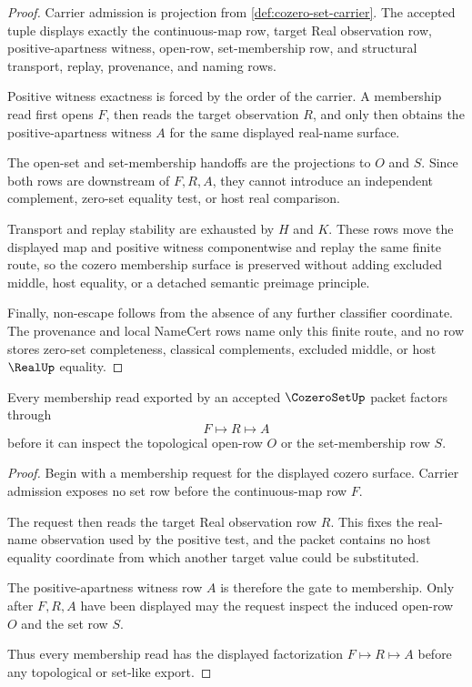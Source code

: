 \begin{proof}
Carrier admission is projection from \autoref{def:cozero-set-carrier}. The accepted tuple displays exactly the continuous-map row, target Real observation row, positive-apartness witness, open-row, set-membership row, and structural transport, replay, provenance, and naming rows.

Positive witness exactness is forced by the order of the carrier. A membership read first opens $F$, then reads the target observation $R$, and only then obtains the positive-apartness witness $A$ for the same displayed real-name surface.

The open-set and set-membership handoffs are the projections to $O$ and $S$. Since both rows are downstream of $F,R,A$, they cannot introduce an independent complement, zero-set equality test, or host real comparison.

Transport and replay stability are exhausted by $H$ and $K$. These rows move the displayed map and positive witness componentwise and replay the same finite route, so the cozero membership surface is preserved without adding excluded middle, host equality, or a detached semantic preimage principle.

Finally, non-escape follows from the absence of any further classifier coordinate. The provenance and local NameCert rows name only this finite route, and no row stores zero-set completeness, classical complements, excluded middle, or host $\RealUp$ equality.
\end{proof}

\begin{theorem}
\label{thm:cozero-set-positive-witness-route}
Every membership read exported by an accepted $\CozeroSetUp$ packet factors through
$$
F \longmapsto R \longmapsto A
$$
before it can inspect the topological open-row $O$ or the set-membership row $S$.
\end{theorem}
\begin{proof}
Begin with a membership request for the displayed cozero surface. Carrier admission exposes no set row before the continuous-map row $F$.

The request then reads the target Real observation row $R$. This fixes the real-name observation used by the positive test, and the packet contains no host equality coordinate from which another target value could be substituted.

The positive-apartness witness row $A$ is therefore the gate to membership. Only after $F,R,A$ have been displayed may the request inspect the induced open-row $O$ and the set row $S$.

Thus every membership read has the displayed factorization $F \longmapsto R \longmapsto A$ before any topological or set-like export.
\end{proof}

